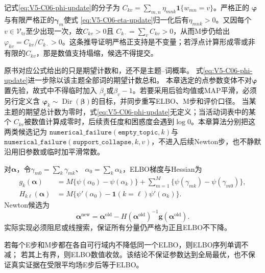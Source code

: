 记式\eqref{eq:V5-C06-phi-update}的分子为
$C_{kv}=\sum_{m,n}\eta_{mnk}\mathbf1\{w_{mn}=v\}$。严格正的
$\boldsymbol\varphi$与有限严格正的$\boldsymbol\gamma_m$使式
\eqref{eq:V5-C06-eta-update}归一化后有$\eta_{mnk}>0$。又因每个
$v\in\mathcal V_{\mathrm{tr}}$至少出现一次，故$C_{kv}>0$且
$C_{k\cdot}=\sum_v C_{kv}>0$，从而M步仍给出
$\varphi_{kv}=C_{kv}/C_{k\cdot}>0$。这条推导证明严格正支持是不变量；若浮点计算形成零或非有限的$C_{kv}$，那是数值支持塌缩，候选不得提交。

\begin{correctionbox}
原书对应公式给出的只是期望计数和，还不是主题--词概率。
式\eqref{eq:V5-C06-phi-update}进一步除以该主题全部词的期望计数总和。
本章选定的点参数变体不对$\boldsymbol\varphi$置先验，故式中不得临时加入
$\beta_v$或$\beta_v-1$。若要采用后验均值或MAP平滑，必须另行定义含
$\boldsymbol\varphi_k\sim\operatorname{Dir}(\boldsymbol\beta)$的目标，并同步重写ELBO、M步和评价口径。
当某主题的期望总计数为零时，式\eqref{eq:V5-C06-phi-update}无定义；当活动词表中的某个
$C_{kv}$被数值计算成零时，后续责任度和困惑度会遇到$\log0$。本章算法分别把这两类候选记为
$\texttt{numerical\_failure}(\texttt{empty\_topic},k)$与
$\texttt{numerical\_failure}(\texttt{support\_collapse},k,v)$，不进入后续Newton步，也不静默沿用旧参数或临时加平滑常数。
\end{correctionbox}

对$\boldsymbol\alpha$，令$\gamma_{m0}=\sum_k\gamma_{mk}$、
$\alpha_0=\sum_k\alpha_k$，ELBO梯度与Hessian为
\begin{align}
g_k(\boldsymbol\alpha)
&=M\{\psi(\alpha_0)-\psi(\alpha_k)\}
+\sum_{m=1}^{M}\{\psi(\gamma_{mk})-\psi(\gamma_{m0})\},
\label{eq:V5-C06-alpha-gradient}\\
H_{k\ell}(\boldsymbol\alpha)
&=M\{\psi'(\alpha_0)-\mathbf1(k=\ell)\psi'(\alpha_k)\}.
\label{eq:V5-C06-alpha-hessian}
\end{align}
Newton候选为
\begin{equation}
\boldsymbol\alpha^{\mathrm{new}}
=\boldsymbol\alpha^{\mathrm{old}}
-H(\boldsymbol\alpha^{\mathrm{old}})^{-1}
\boldsymbol g(\boldsymbol\alpha^{\mathrm{old}}).
\label{eq:V5-C06-alpha-newton}
\end{equation}
实际实现必须阻尼或线搜索，保证所有分量仍严格为正且ELBO不下降。

\begin{proposition}[受限变分EM的单调性边界]\label{prop:V5-C06-vem-monotone}
若每个E步和M步都在各自可行域内不降低同一个ELBO，则ELBO序列单调不减；
若其上有界，则ELBO数值收敛。该结论不保证参数达到全局最优，也不保证真实证据在受限平均场E步后等于ELBO。
\end{proposition}

